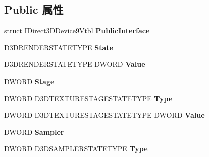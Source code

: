 \subsection*{Public 属性}
\begin{DoxyCompactItemize}
\item 
\mbox{\label{struct___i_direct3_d_device9_vtbl___i_n_t_a9750d21f11cbc6c5c511c00a0409b8ab}} 
\hyperlink{interfacestruct}{struct} I\+Direct3\+D\+Device9\+Vtbl {\bfseries Public\+Interface}
\item 
\mbox{\label{struct___i_direct3_d_device9_vtbl___i_n_t_ad8111a1cb4c176861135ac7505eecb93}} 
D3\+D\+R\+E\+N\+D\+E\+R\+S\+T\+A\+T\+E\+T\+Y\+PE {\bfseries State}
\item 
\mbox{\label{struct___i_direct3_d_device9_vtbl___i_n_t_abbd9ded6cebb65c188c61e38f5e0e96a}} 
D3\+D\+R\+E\+N\+D\+E\+R\+S\+T\+A\+T\+E\+T\+Y\+PE D\+W\+O\+RD {\bfseries Value}
\item 
\mbox{\label{struct___i_direct3_d_device9_vtbl___i_n_t_a15e16871235a5952c7052e9be2bd52b4}} 
D\+W\+O\+RD {\bfseries Stage}
\item 
\mbox{\label{struct___i_direct3_d_device9_vtbl___i_n_t_a834edec9dd5740bee630b75852b422b6}} 
D\+W\+O\+RD D3\+D\+T\+E\+X\+T\+U\+R\+E\+S\+T\+A\+G\+E\+S\+T\+A\+T\+E\+T\+Y\+PE {\bfseries Type}
\item 
\mbox{\label{struct___i_direct3_d_device9_vtbl___i_n_t_a1ebb4a5f4d312b6389fe54eaee76b40c}} 
D\+W\+O\+RD D3\+D\+T\+E\+X\+T\+U\+R\+E\+S\+T\+A\+G\+E\+S\+T\+A\+T\+E\+T\+Y\+PE D\+W\+O\+RD {\bfseries Value}
\item 
\mbox{\label{struct___i_direct3_d_device9_vtbl___i_n_t_aaf5e8beafd8f2a2c3ccfb5361b0036c4}} 
D\+W\+O\+RD {\bfseries Sampler}
\item 
\mbox{\label{struct___i_direct3_d_device9_vtbl___i_n_t_ae64917ad00ac0d86fd1c6a3ef8767b42}} 
D\+W\+O\+RD D3\+D\+S\+A\+M\+P\+L\+E\+R\+S\+T\+A\+T\+E\+T\+Y\+PE {\bfseries Type}

\end{DoxyCompactItemize}
